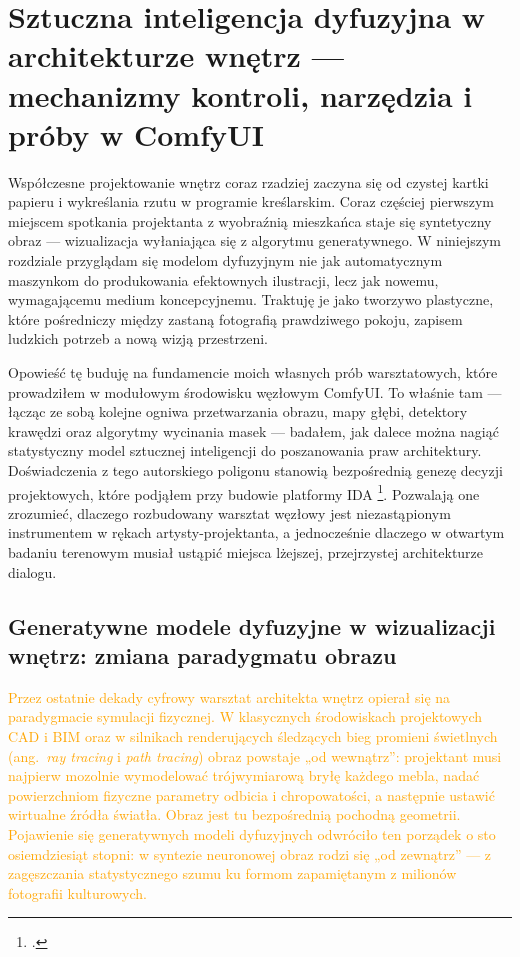 \chapter{Sztuczna inteligencja dyfuzyjna w architekturze wnętrz --- mechanizmy kontroli, narzędzia i próby w ComfyUI}
\label{ch04:top}

Współczesne projektowanie wnętrz coraz rzadziej zaczyna się od czystej kartki papieru i wykreślania rzutu w programie kreślarskim. Coraz częściej pierwszym miejscem spotkania projektanta z wyobraźnią mieszkańca staje się syntetyczny obraz --- wizualizacja wyłaniająca się z algorytmu generatywnego. W niniejszym rozdziale przyglądam się modelom dyfuzyjnym nie jak automatycznym maszynkom do produkowania efektownych ilustracji, lecz jak nowemu, wymagającemu medium koncepcyjnemu. Traktuję je jako tworzywo plastyczne, które pośredniczy między zastaną fotografią prawdziwego pokoju, zapisem ludzkich potrzeb a nową wizją przestrzeni.

Opowieść tę buduję na fundamencie moich własnych prób warsztatowych, które prowadziłem w modułowym środowisku węzłowym ComfyUI. To właśnie tam --- łącząc ze sobą kolejne ogniwa przetwarzania obrazu, mapy głębi, detektory krawędzi oraz algorytmy wycinania masek --- badałem, jak dalece można nagiąć statystyczny model sztucznej inteligencji do poszanowania praw architektury. Doświadczenia z tego autorskiego poligonu stanowią bezpośrednią genezę decyzji projektowych, które podjąłem przy budowie platformy IDA \footcite{idaPlatform2026}. Pozwalają one zrozumieć, dlaczego rozbudowany warsztat węzłowy jest niezastąpionym instrumentem w rękach artysty-projektanta, a jednocześnie dlaczego w otwartym badaniu terenowym musiał ustąpić miejsca lżejszej, przejrzystej architekturze dialogu.

\section{Generatywne modele dyfuzyjne w wizualizacji wnętrz: zmiana paradygmatu obrazu}
\label{ch04:sec:genai-medium}

\textcolor{orange}{Przez ostatnie dekady cyfrowy warsztat architekta wnętrz opierał się na paradygmacie symulacji fizycznej. W klasycznych środowiskach projektowych CAD i BIM oraz w silnikach renderujących śledzących bieg promieni świetlnych (ang.\ \emph{ray tracing} i \emph{path tracing}) obraz powstaje „od wewnątrz”: projektant musi najpierw mozolnie wymodelować trójwymiarową bryłę każdego mebla, nadać powierzchniom fizyczne parametry odbicia i chropowatości, a następnie ustawić wirtualne źródła światła. Obraz jest tu bezpośrednią pochodną geometrii. Pojawienie się generatywnych modeli dyfuzyjnych odwróciło ten porządek o sto osiemdziesiąt stopni: w syntezie neuronowej obraz rodzi się „od zewnątrz” --- z zagęszczania statystycznego szumu ku formom zapamiętanym z milionów fotografii kulturowych.}

